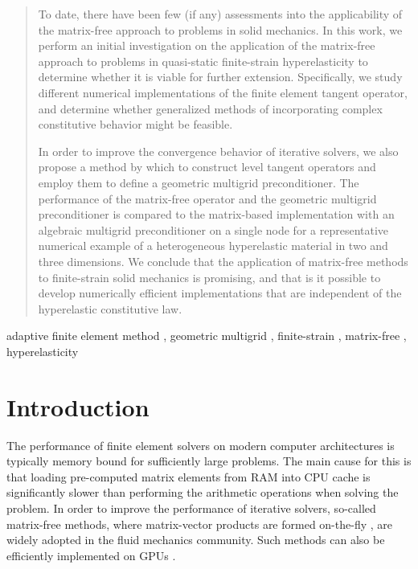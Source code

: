 \documentclass[times,doublespace]{nmeauth}
\newcommand{\changeDD}[1]{#1}
\newcommand{\changeJP}[1]{#1}
\begin{document}
\begin{frontmatter}
\begin{abstract}
    \changeJP{To date, there have been few (if any) assessments into the applicability of the matrix-free approach to problems in solid mechanics.
    In this work, we perform an initial investigation on the application of the matrix-free approach to problems in quasi-static finite-strain hyperelasticity to determine whether it is viable for further extension.
    Specifically, we study different numerical implementations of the finite element tangent operator, and determine whether generalized methods of incorporating complex constitutive behavior might be feasible.
    }
    In order to improve the convergence behavior of iterative solvers, we also propose a method by which to construct level tangent operators
    and employ them to define a geometric multigrid preconditioner.
    The performance of the matrix-free operator and the geometric multigrid preconditioner is compared to the matrix-based implementation with an algebraic multigrid preconditioner \changeDD{ on a single node} for a representative numerical example of a heterogeneous hyperelastic material in two and three dimensions.
    \changeJP{We conclude that the application of matrix-free methods to finite-strain solid mechanics is promising, and that is it possible to develop numerically efficient implementations that are independent of the hyperelastic constitutive law.}
  \end{abstract}

\ifijnme


  \maketitle

\else
    \begin{keyword}
        adaptive finite element method \sep
        geometric multigrid \sep
        finite-strain \sep
        matrix-free \sep
        hyperelasticity
    \end{keyword}

\end{frontmatter}
\fi

\section{Introduction}

The performance of finite element solvers on modern computer architectures is typically memory bound \changeDD{ for sufficiently large problems}.
The main cause for this is that loading pre-computed matrix elements from RAM into CPU cache is significantly slower than performing the arithmetic operations when solving the problem.
In order to improve the performance of iterative solvers, so-called matrix-free methods,
where matrix-vector products are formed on-the-fly \cite{kronbichler12,May2015, Krank2017, Brown2010, Gmeiner2016},
are widely adopted in the fluid mechanics community.
Such methods can also be efficiently implemented on GPUs \cite{Abdelfattah2016, ljungkvist2017multigrid}.
\end{document}
